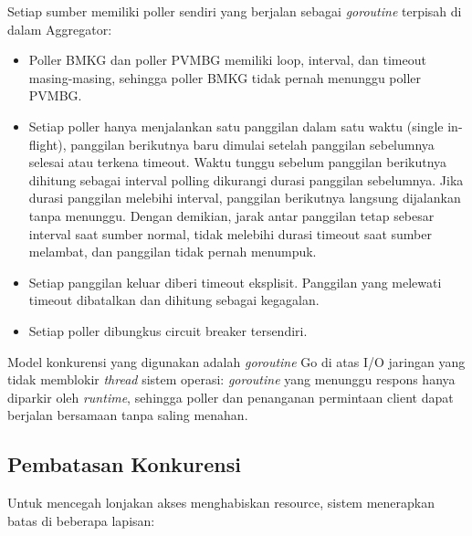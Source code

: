 Setiap sumber memiliki poller sendiri yang berjalan sebagai \textit{goroutine} terpisah di dalam Aggregator:

\begin{itemize}
\tightlist
\item
  Poller BMKG dan poller PVMBG memiliki loop, interval, dan timeout masing-masing, sehingga poller BMKG tidak pernah menunggu poller PVMBG.\\
\item
  Setiap poller hanya menjalankan satu panggilan dalam satu waktu (single in-flight), panggilan berikutnya baru dimulai setelah panggilan sebelumnya selesai atau terkena timeout. Waktu tunggu sebelum panggilan berikutnya dihitung sebagai interval polling dikurangi durasi panggilan sebelumnya. Jika durasi panggilan melebihi interval, panggilan berikutnya langsung dijalankan tanpa menunggu. Dengan demikian, jarak antar panggilan tetap sebesar interval saat sumber normal, tidak melebihi durasi timeout saat sumber melambat, dan panggilan tidak pernah menumpuk.\\
\item
  Setiap panggilan keluar diberi timeout eksplisit. Panggilan yang melewati timeout dibatalkan dan dihitung sebagai kegagalan.\\
\item
  Setiap poller dibungkus circuit breaker tersendiri.
\end{itemize}

Model konkurensi yang digunakan adalah \textit{goroutine} Go di atas I/O jaringan yang tidak memblokir \textit{thread} sistem operasi: \textit{goroutine} yang menunggu respons hanya diparkir oleh \textit{runtime}, sehingga poller dan penanganan permintaan client dapat berjalan bersamaan tanpa saling menahan.

\subsection{Pembatasan Konkurensi}\label{sec:p2-batas}

Untuk mencegah lonjakan akses menghabiskan resource, sistem menerapkan batas di beberapa lapisan:

